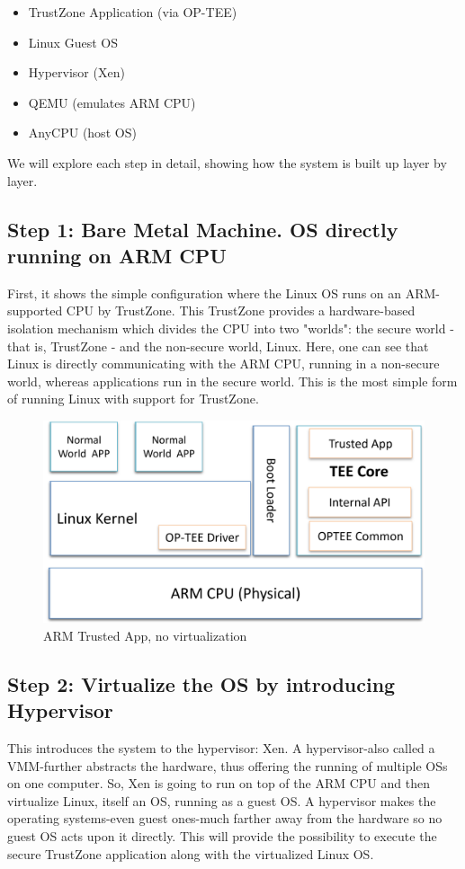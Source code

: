 \documentclass[acmtog]{acmart}
\begin{document}
\begin{itemize}
    \item TrustZone Application (via OP-TEE)
    \item Linux Guest OS
    \item Hypervisor (Xen)
    \item QEMU (emulates ARM CPU)
    \item AnyCPU (host OS)
\end{itemize}

We will explore each step in detail, showing how the system is built up layer by layer.

\subsection{Step 1: Bare Metal Machine. OS directly running on ARM CPU}

First, it shows the simple configuration where the Linux OS runs on an ARM-supported CPU by TrustZone. This TrustZone provides a hardware-based isolation mechanism which divides the CPU into two "worlds": the secure world - that is, TrustZone - and the non-secure world, Linux. Here, one can see that Linux is directly communicating with the ARM CPU, running in a non-secure world, whereas applications run in the secure world. This is the most simple form of running Linux with support for TrustZone.
\begin{figure}[ht]
  \centering
  \includegraphics[width=\columnwidth]{images/1.png}
  \caption{ARM Trusted App, no virtualization}
  \label{fig:image_label}
\end{figure}



\subsection{Step 2: Virtualize the OS by introducing Hypervisor}
This introduces the system to the hypervisor: Xen. A hypervisor-also called a VMM-further abstracts the hardware, thus offering the running of multiple OSs on one computer. So, Xen is going to run on top of the ARM CPU and then virtualize Linux, itself an OS, running as a guest OS. A hypervisor makes the operating systems-even guest ones-much farther away from the hardware so no guest OS acts upon it directly. This will provide the possibility to execute the secure TrustZone application along with the virtualized Linux OS.
\end{document}
